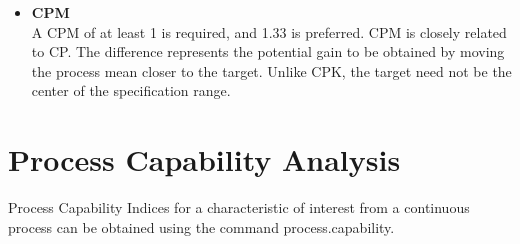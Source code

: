 \documentclass[MASTER-SPC.tex]{subfiles}
\begin{document}
{\begin{itemize}
\item\textbf{ CPM}\\
A CPM of at least 1 is required, and 1.33 is preferred. CPM is closely related to CP. The difference represents the potential gain to be obtained by moving the process mean closer to the target. Unlike CPK, the target need not be the center of the specification range.
\end{itemize}
\newpage
}
\newpage

\section{Process Capability Analysis}


Process Capability Indices for a characteristic of interest from a continuous process can be
obtained using the command process.capability.
\end{document}
